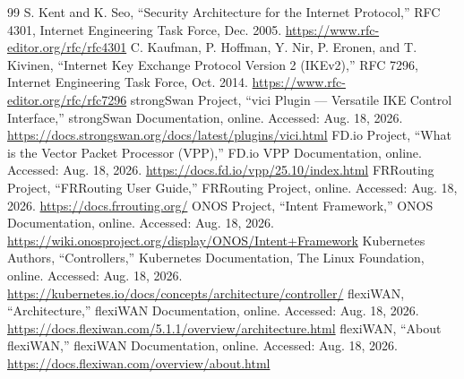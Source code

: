 \documentclass[11pt,a4paper,twoside]{ltjsarticle}
\begin{document}
\begin{thebibliography}{99}
 S. Kent and K. Seo, ``Security Architecture for the Internet Protocol,'' RFC 4301, Internet Engineering Task Force, Dec. 2005. \url{https://www.rfc-editor.org/rfc/rfc4301}
 C. Kaufman, P. Hoffman, Y. Nir, P. Eronen, and T. Kivinen, ``Internet Key Exchange Protocol Version 2 (IKEv2),'' RFC 7296, Internet Engineering Task Force, Oct. 2014. \url{https://www.rfc-editor.org/rfc/rfc7296}
 strongSwan Project, ``vici Plugin --- Versatile IKE Control Interface,'' strongSwan Documentation, online. Accessed: Aug. 18, 2026. \url{https://docs.strongswan.org/docs/latest/plugins/vici.html}
 FD.io Project, ``What is the Vector Packet Processor (VPP),'' FD.io VPP Documentation, online. Accessed: Aug. 18, 2026. \url{https://docs.fd.io/vpp/25.10/index.html}
 FRRouting Project, ``FRRouting User Guide,'' FRRouting Project, online. Accessed: Aug. 18, 2026. \url{https://docs.frrouting.org/}
 ONOS Project, ``Intent Framework,'' ONOS Documentation, online. Accessed: Aug. 18, 2026. \url{https://wiki.onosproject.org/display/ONOS/Intent+Framework}
 Kubernetes Authors, ``Controllers,'' Kubernetes Documentation, The Linux Foundation, online. Accessed: Aug. 18, 2026. \url{https://kubernetes.io/docs/concepts/architecture/controller/}
 flexiWAN, ``Architecture,'' flexiWAN Documentation, online. Accessed: Aug. 18, 2026. \url{https://docs.flexiwan.com/5.1.1/overview/architecture.html}
 flexiWAN, ``About flexiWAN,'' flexiWAN Documentation, online. Accessed: Aug. 18, 2026. \url{https://docs.flexiwan.com/overview/about.html}
\end{thebibliography}
\end{document}
